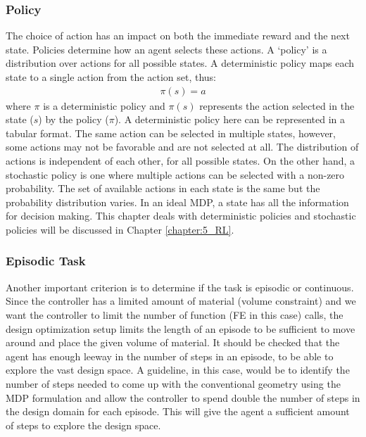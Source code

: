 \subsubsection{Policy}
The choice of action has an impact on both the immediate reward and the next state. Policies determine how an agent selects these actions. A `policy' is a distribution over actions for all possible states. A deterministic policy maps each state to a single action from the action set, thus:
\begin{align*}
    \pi(s) = a
\end{align*}
where $\pi$ is a deterministic policy and $\pi(s)$ represents the action selected in the state ($s$) by the policy ($\pi$). A deterministic policy here can be represented in a tabular format. The same action can be selected in multiple states, however, some actions may not be favorable and are not selected at all. The distribution of actions is independent of each other, for all possible states. On the other hand, a stochastic policy is one where multiple actions can be selected with a non-zero probability. The set of available actions in each state is the same but the probability distribution varies. In an ideal MDP, a state has all the information for decision making. This chapter deals with deterministic policies and stochastic policies will be discussed in Chapter \ref{chapter:5_RL}.

\subsubsection{Episodic Task}
Another important criterion is to determine if the task is episodic or continuous. Since the controller has a limited amount of material (volume constraint) and we want the controller to limit the number of function (FE in this case) calls, the design optimization setup limits the length of an episode to be sufficient to move around and place the given volume of material. It should be checked that the agent has enough leeway in the number of steps in an episode, to be able to explore the vast design space. A guideline, in this case, would be to identify the number of steps needed to come up with the conventional geometry using the MDP formulation and allow the controller to spend double the number of steps in the design domain for each episode. This will give the agent a sufficient amount of steps to explore the design space.  

